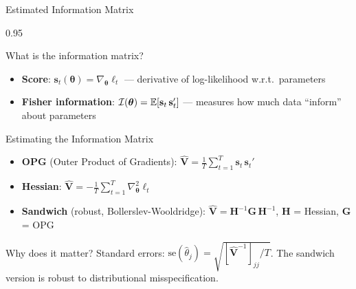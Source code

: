 \documentclass[9pt, aspectratio=169, t]{beamer}
\begin{document}
\begin{frame}{Estimated Information Matrix}
    \begin{cminipage}{0.95\textwidth}
    {\scriptsize
    \begin{block}{What is the information matrix?}
        \begin{itemize}\setlength{\itemsep}{0pt}
            \item \textbf{Score}: $\mathbf{s}_t(\boldsymbol{\theta}) = \nabla_{\boldsymbol{\theta}} \ell_t$ --- derivative of log-likelihood w.r.t.\ parameters
            \item \textbf{Fisher information}: $\mathcal{I}(\boldsymbol{\theta}) = \mathbb{E}[\mathbf{s}_t \, \mathbf{s}_t']$ --- measures how much data ``inform'' about parameters
        \end{itemize}
    \end{block}
    \vspace{-1mm}
    \begin{exampleblock}{Estimating the Information Matrix}
        \begin{itemize}\setlength{\itemsep}{0pt}
            \item \textbf{OPG} (Outer Product of Gradients): $\hat{\mathbf{V}} = \frac{1}{T}\sum_{t=1}^T \mathbf{s}_t \, \mathbf{s}_t'$
            \item \textbf{Hessian}: $\hat{\mathbf{V}} = -\frac{1}{T}\sum_{t=1}^T \nabla^2_{\boldsymbol{\theta}} \ell_t$
            \item \textbf{Sandwich} (robust, Bollerslev-Wooldridge): $\hat{\mathbf{V}} = \mathbf{H}^{-1} \mathbf{G} \, \mathbf{H}^{-1}$, $\mathbf{H}$ = Hessian, $\mathbf{G}$ = OPG
        \end{itemize}
    \end{exampleblock}
    \vspace{-1mm}
    \begin{alertblock}{Why does it matter?}
        Standard errors: $\text{se}(\hat{\theta}_j) = \sqrt{[\hat{\mathbf{V}}^{-1}]_{jj} / T}$. The sandwich version is robust to distributional misspecification.
    \end{alertblock}
    }
    \end{cminipage}
\end{frame}
\end{document}
